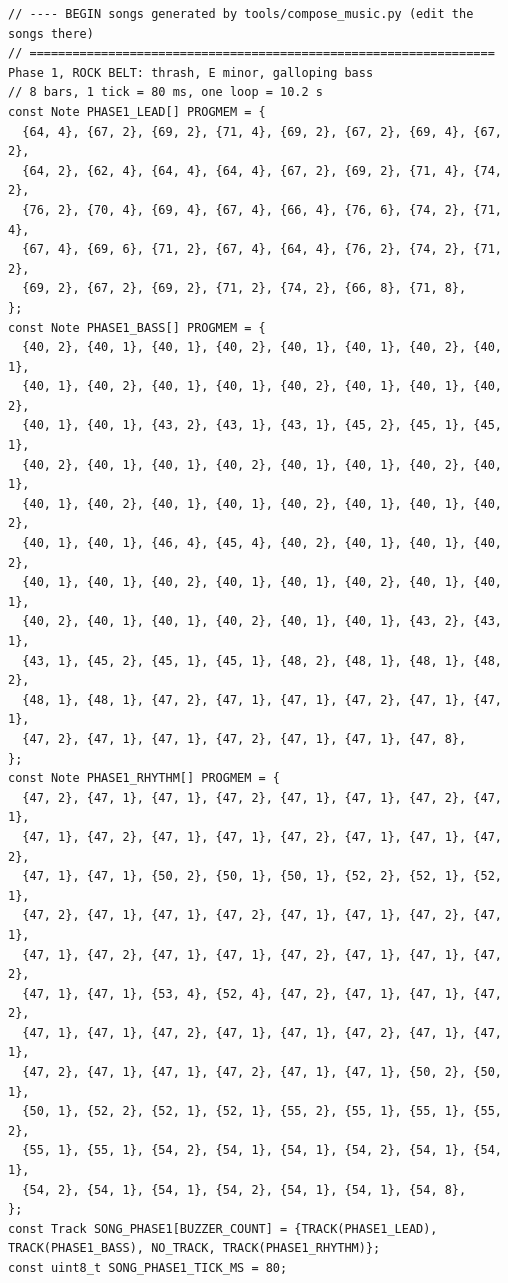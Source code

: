 \documentclass[11pt,a4paper]{article}
\begin{document}
\begin{latin}
\begin{lstlisting}[language=Arduino]
// ---- BEGIN songs generated by tools/compose_music.py (edit the songs there)
// ================================================================= Phase 1, ROCK BELT: thrash, E minor, galloping bass
// 8 bars, 1 tick = 80 ms, one loop = 10.2 s
const Note PHASE1_LEAD[] PROGMEM = {
  {64, 4}, {67, 2}, {69, 2}, {71, 4}, {69, 2}, {67, 2}, {69, 4}, {67, 2},
  {64, 2}, {62, 4}, {64, 4}, {64, 4}, {67, 2}, {69, 2}, {71, 4}, {74, 2},
  {76, 2}, {70, 4}, {69, 4}, {67, 4}, {66, 4}, {76, 6}, {74, 2}, {71, 4},
  {67, 4}, {69, 6}, {71, 2}, {67, 4}, {64, 4}, {76, 2}, {74, 2}, {71, 2},
  {69, 2}, {67, 2}, {69, 2}, {71, 2}, {74, 2}, {66, 8}, {71, 8},
};
const Note PHASE1_BASS[] PROGMEM = {
  {40, 2}, {40, 1}, {40, 1}, {40, 2}, {40, 1}, {40, 1}, {40, 2}, {40, 1},
  {40, 1}, {40, 2}, {40, 1}, {40, 1}, {40, 2}, {40, 1}, {40, 1}, {40, 2},
  {40, 1}, {40, 1}, {43, 2}, {43, 1}, {43, 1}, {45, 2}, {45, 1}, {45, 1},
  {40, 2}, {40, 1}, {40, 1}, {40, 2}, {40, 1}, {40, 1}, {40, 2}, {40, 1},
  {40, 1}, {40, 2}, {40, 1}, {40, 1}, {40, 2}, {40, 1}, {40, 1}, {40, 2},
  {40, 1}, {40, 1}, {46, 4}, {45, 4}, {40, 2}, {40, 1}, {40, 1}, {40, 2},
  {40, 1}, {40, 1}, {40, 2}, {40, 1}, {40, 1}, {40, 2}, {40, 1}, {40, 1},
  {40, 2}, {40, 1}, {40, 1}, {40, 2}, {40, 1}, {40, 1}, {43, 2}, {43, 1},
  {43, 1}, {45, 2}, {45, 1}, {45, 1}, {48, 2}, {48, 1}, {48, 1}, {48, 2},
  {48, 1}, {48, 1}, {47, 2}, {47, 1}, {47, 1}, {47, 2}, {47, 1}, {47, 1},
  {47, 2}, {47, 1}, {47, 1}, {47, 2}, {47, 1}, {47, 1}, {47, 8},
};
const Note PHASE1_RHYTHM[] PROGMEM = {
  {47, 2}, {47, 1}, {47, 1}, {47, 2}, {47, 1}, {47, 1}, {47, 2}, {47, 1},
  {47, 1}, {47, 2}, {47, 1}, {47, 1}, {47, 2}, {47, 1}, {47, 1}, {47, 2},
  {47, 1}, {47, 1}, {50, 2}, {50, 1}, {50, 1}, {52, 2}, {52, 1}, {52, 1},
  {47, 2}, {47, 1}, {47, 1}, {47, 2}, {47, 1}, {47, 1}, {47, 2}, {47, 1},
  {47, 1}, {47, 2}, {47, 1}, {47, 1}, {47, 2}, {47, 1}, {47, 1}, {47, 2},
  {47, 1}, {47, 1}, {53, 4}, {52, 4}, {47, 2}, {47, 1}, {47, 1}, {47, 2},
  {47, 1}, {47, 1}, {47, 2}, {47, 1}, {47, 1}, {47, 2}, {47, 1}, {47, 1},
  {47, 2}, {47, 1}, {47, 1}, {47, 2}, {47, 1}, {47, 1}, {50, 2}, {50, 1},
  {50, 1}, {52, 2}, {52, 1}, {52, 1}, {55, 2}, {55, 1}, {55, 1}, {55, 2},
  {55, 1}, {55, 1}, {54, 2}, {54, 1}, {54, 1}, {54, 2}, {54, 1}, {54, 1},
  {54, 2}, {54, 1}, {54, 1}, {54, 2}, {54, 1}, {54, 1}, {54, 8},
};
const Track SONG_PHASE1[BUZZER_COUNT] = {TRACK(PHASE1_LEAD), TRACK(PHASE1_BASS), NO_TRACK, TRACK(PHASE1_RHYTHM)};
const uint8_t SONG_PHASE1_TICK_MS = 80;


\end{lstlisting}
\end{latin}
\end{document}
